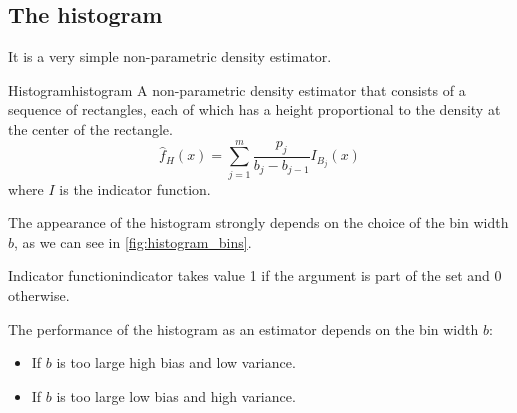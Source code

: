 \subsection{The histogram}
It is a very simple non-parametric density estimator.

\begin{definition}{Histogram}{histogram}
	A non-parametric density estimator that consists of a sequence of
	rectangles, each of which has a height proportional
	to the density at the center of the rectangle.
	\tcblower
	\begin{equation*}
		\widehat{f}_H(x) = \sum_{j=1}^m \frac{p_j}{b_j - b_{j-1}} I_{B_j}(x)
	\end{equation*}
	where $I$ is the indicator function.
\end{definition}

The appearance of the histogram strongly depends on the choice of the bin width $b$,
as we can see in \cref{fig:histogram_bins}.

\begin{definition}{Indicator function}{indicator} takes value 1 if
	the argument is part of the set and 0 otherwise.
\end{definition}


\begin{note}
	The performance of the histogram as an estimator depends on the bin width $b$:
	\begin{itemize}
		\item If $b$ is too large \textrightarrow{} high bias and low variance.
		\item If $b$ is too large \textrightarrow{} low bias and high variance.
	\end{itemize}
\end{note}

